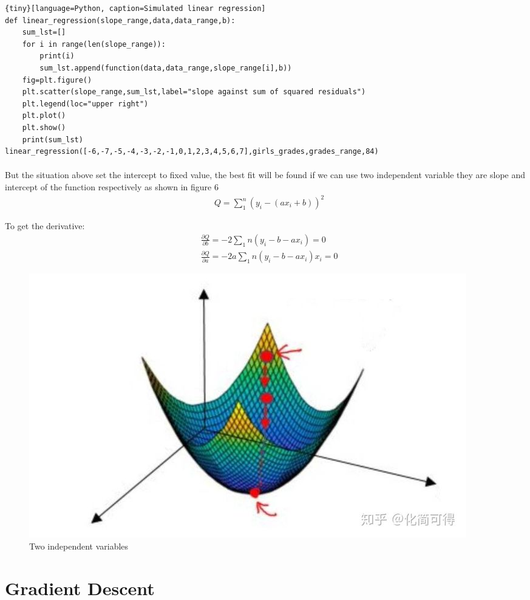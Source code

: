 \documentclass[a4paper,12pt]{article}
\begin{document}
\begin{spacing}{2}
\begin{tiny}
\begin{lstlisting}{tiny}[language=Python, caption=Simulated linear regression]
def linear_regression(slope_range,data,data_range,b):
    sum_lst=[]
    for i in range(len(slope_range)):
        print(i)
        sum_lst.append(function(data,data_range,slope_range[i],b))
    fig=plt.figure()
    plt.scatter(slope_range,sum_lst,label="slope against sum of squared residuals")
    plt.legend(loc="upper right")
    plt.plot()
    plt.show()
    print(sum_lst)
linear_regression([-6,-7,-5,-4,-3,-2,-1,0,1,2,3,4,5,6,7],girls_grades,grades_range,84)
\end{lstlisting}
\end{tiny}
\paragraph{ }But the situation above set the intercept to fixed value, the best fit will be found if we can use two independent variable they are slope and intercept of the function respectively as shown in figure 6
\begin{align}
&Q=\sum_{1}^n(y_{i}-(ax_{i}+b))^{2}
\end{align}

To get the derivative:
\begin{align}
&\frac{\partial Q}{\partial b}=-2\sum_{1}n(y_{i}-b-ax_{i})=0\\
&\frac{\partial Q}{\partial a}=-2a\sum_{1}n(y_{i}-b-ax_{i})x_{i}=0
\end{align}
\begin{figure}[h]
\centering
\includegraphics[scale=0.5]{Figure_6.jpg}
\caption{Two independent variables}
\label{Two independent variables}
\end{figure}
\section{Gradient Descent}

\end{spacing}
\end{document}
